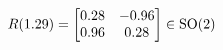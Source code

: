 \documentclass[preview]{standalone}
\begin{document}
\begin{align*}
\special{dvisvgm:raw <g id='unique000'>}R(1.29) = \begin{bmatrix} 0.28 & -0.96 \\ 0.96 & 0.28 \end{bmatrix} \in \text{SO}(2)\special{dvisvgm:raw </g>}
\end{align*}
\end{document}
